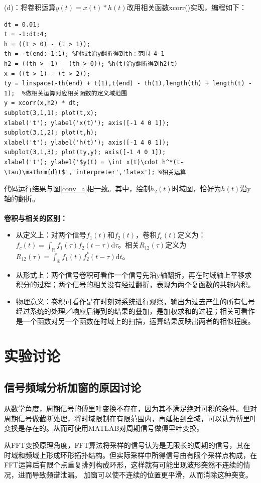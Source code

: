 \documentclass[12pt]{article}
\begin{document}
(d)：将卷积运算$y(t)=x(t) * h(t)$改用相关函数xcorr()实现，编程如下：
\begin{lstlisting}
dt = 0.01;
t = -1:dt:4;
h = ((t > 0) - (t > 1));
th = -t(end:-1:1); %时域t沿y翻折得到th：范围-4-1
h2 = ((th > -1) - (th > 0)); %h(t)沿y翻折得到h2(t)
x = ((t > 1) - (t > 2));
ty = linspace(-th(end) + t(1),t(end) - th(1),length(th) + length(t) - 1);  %做相关运算对应相关函数的定义域范围
y = xcorr(x,h2) * dt;
subplot(3,1,1); plot(t,x);
xlabel('t'); ylabel('x(t)'); axis([-1 4 0 1]);
subplot(3,1,2); plot(t,h);
xlabel('t'); ylabel('h(t)'); axis([-1 4 0 1]);
subplot(3,1,3); plot(ty,y); axis([-1 4 0 1]);
xlabel('t'); ylabel('$y(t) = \int x(t)\cdot h^*(t-\tau)\mathrm{d}t$','interpreter','latex'); %相关运算
\end{lstlisting}
代码运行结果与图\ref{conv_a}相一致。其中，绘制$h_2(t)$时域图，恰好为$h(t)$沿y轴的翻折。
\\\hspace{\zfill}\\
\textbf{卷积与相关的区别：}
\begin{itemize}
\item 从定义上：对两个信号$f_1(t)$和$f_2(t)$，卷积$f_c(t)$定义为：$f_c(t)=\int_{\mathbb{R}}f_1(\tau)f_2(t-\tau)\mathrm{d}\tau$。相关$R_{12}(\tau)$定义为$R_{12}(\tau)=\int_{\mathbb{R}}f_1(t)f_2^*(t-\tau)\mathrm{d}t$。
\item 从形式上：两个信号卷积可看作一个信号先沿y轴翻折，再在时域轴上平移求积分的过程；两个信号的相关没有经过翻折，表现为两个复函数的共轭内积。
    \item 物理意义：卷积可看作是在时刻对系统进行观察，输出为过去产生的所有信号经过系统的处理／响应后得到的结果的叠加，是加权求和的过程；相关可看作是一个函数对另一个函数在时域上的扫描，运算结果反映出两者的相似程度。
\end{itemize}


\section{实验讨论}
\subsection{信号频域分析加窗的原因讨论}
从数学角度，周期信号的傅里叶变换不存在，因为其不满足绝对可积的条件。但对周期信号做截断处理，将时域限制在有限范围内，再延拓到全域，可以认为傅里叶变换是存在的。从而可使用MATLAB对周期信号做傅里叶变换。

从FFT变换原理角度，FFT算法将采样的信号认为是无限长的周期的信号，其在时域和频域上形成环形拓扑结构。但实际采样中所得信号由有限个采样点构成，在FFT运算后有限个点重复排列构成环形，这样就有可能出现波形突然不连续的情况，进而导致频谱泄漏。
加窗可以使不连续的位置更平滑，从而消除这种突变。
\end{document}
